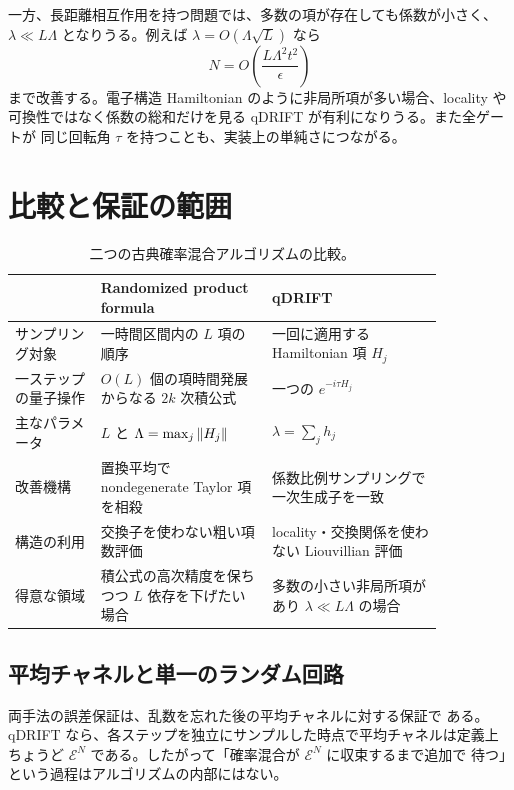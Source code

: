 \documentclass[uplatex,dvipdfmx,11pt,a4paper]{jsarticle}
\newcommand{\cE}{\mathcal{E}}
\begin{document}
一方、長距離相互作用を持つ問題では、多数の項が存在しても係数が小さく、
$\lambda\ll L\Lambda$ となりうる。例えば
$\lambda=O(\Lambda\sqrt{L})$ なら
\begin{equation}
  N=O\left(\frac{L\Lambda^2t^2}{\epsilon}\right)
\end{equation}
まで改善する。電子構造 Hamiltonian のように非局所項が多い場合、locality や
可換性ではなく係数の総和だけを見る qDRIFT が有利になりうる。また全ゲートが
同じ回転角 $\tau$ を持つことも、実装上の単純さにつながる。

\section{比較と保証の範囲}

\begin{table}[htbp]
  \centering
  \small
  \renewcommand{\arraystretch}{1.35}
  \begin{tabular}{|p{0.17\linewidth}|p{0.34\linewidth}|p{0.34\linewidth}|}
    \hline
    & Randomized product formula & qDRIFT \\
    \hline
    サンプリング対象
      & 一時間区間内の $L$ 項の順序
      & 一回に適用する Hamiltonian 項 $H_j$ \\
    \hline
    一ステップの量子操作
      & $O(L)$ 個の項時間発展からなる $2k$ 次積公式
      & 一つの $e^{-i\tau H_j}$ \\
    \hline
    主なパラメータ
      & $L$ と $\Lambda=\max_j\norm{H_j}$
      & $\lambda=\sum_jh_j$ \\
    \hline
    改善機構
      & 置換平均で nondegenerate Taylor 項を相殺
      & 係数比例サンプリングで一次生成子を一致 \\
    \hline
    構造の利用
      & 交換子を使わない粗い項数評価
      & locality・交換関係を使わない Liouvillian 評価 \\
    \hline
    得意な領域
      & 積公式の高次精度を保ちつつ $L$ 依存を下げたい場合
      & 多数の小さい非局所項があり $\lambda\ll L\Lambda$ の場合 \\
    \hline
  \end{tabular}
  \caption{二つの古典確率混合アルゴリズムの比較。}
  \label{tab:comparison}
\end{table}

\subsection{平均チャネルと単一のランダム回路}

両手法の誤差保証は、乱数を忘れた後の平均チャネルに対する保証で
ある。qDRIFT なら、各ステップを独立にサンプルした時点で平均チャネルは定義上
ちょうど $\cE^N$ である。したがって「確率混合が $\cE^N$ に収束するまで追加で
待つ」という過程はアルゴリズムの内部にはない。
\end{document}
